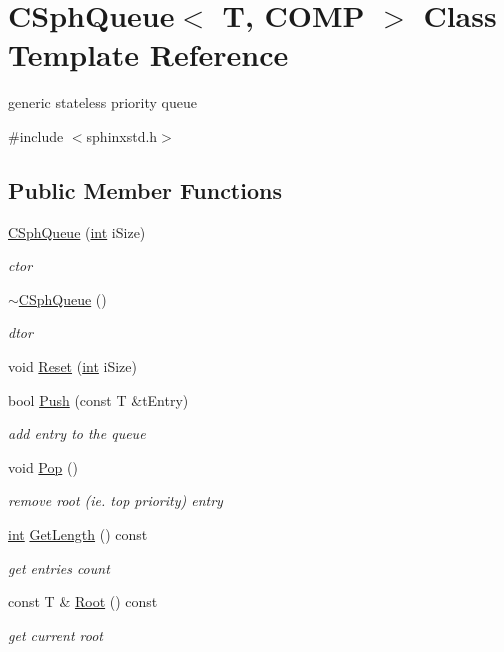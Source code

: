 \hypertarget{classCSphQueue}{\section{C\-Sph\-Queue$<$ T, C\-O\-M\-P $>$ Class Template Reference}
\label{classCSphQueue}
}


generic stateless priority queue  




{\ttfamily \#include $<$sphinxstd.\-h$>$}

\subsection*{Public Member Functions}
\begin{DoxyCompactItemize}
\item 
\hyperlink{classCSphQueue_ab8bcd8d719b5cb4dae3d397e946cc76d}{C\-Sph\-Queue} (\hyperlink{sphinxexpr_8cpp_a4a26e8f9cb8b736e0c4cbf4d16de985e}{int} i\-Size)
\begin{DoxyCompactList}\small\item\em ctor \end{DoxyCompactList}\item 
\hyperlink{classCSphQueue_aaeba52820c682033d345f02c82a1adf9}{$\sim$\-C\-Sph\-Queue} ()
\begin{DoxyCompactList}\small\item\em dtor \end{DoxyCompactList}\item 
void \hyperlink{classCSphQueue_adf7527421a1d1e4dc40568b66ed11d7a}{Reset} (\hyperlink{sphinxexpr_8cpp_a4a26e8f9cb8b736e0c4cbf4d16de985e}{int} i\-Size)
\item 
bool \hyperlink{classCSphQueue_adfe8d25be5ec4b9277679243e9a3c898}{Push} (const T \&t\-Entry)
\begin{DoxyCompactList}\small\item\em add entry to the queue \end{DoxyCompactList}\item 
void \hyperlink{classCSphQueue_a4cef3e79e380174597834b3f118d2067}{Pop} ()
\begin{DoxyCompactList}\small\item\em remove root (ie. top priority) entry \end{DoxyCompactList}\item 
\hyperlink{sphinxexpr_8cpp_a4a26e8f9cb8b736e0c4cbf4d16de985e}{int} \hyperlink{classCSphQueue_ace2ccbaa0b1c45bdbdd352a80a119e15}{Get\-Length} () const 
\begin{DoxyCompactList}\small\item\em get entries count \end{DoxyCompactList}\item 
const T \& \hyperlink{classCSphQueue_a9a7f5f38e28b24887dbe4edf70b42f12}{Root} () const 
\begin{DoxyCompactList}\small\item\em get current root \end{DoxyCompactList}\end{DoxyCompactItemize}
